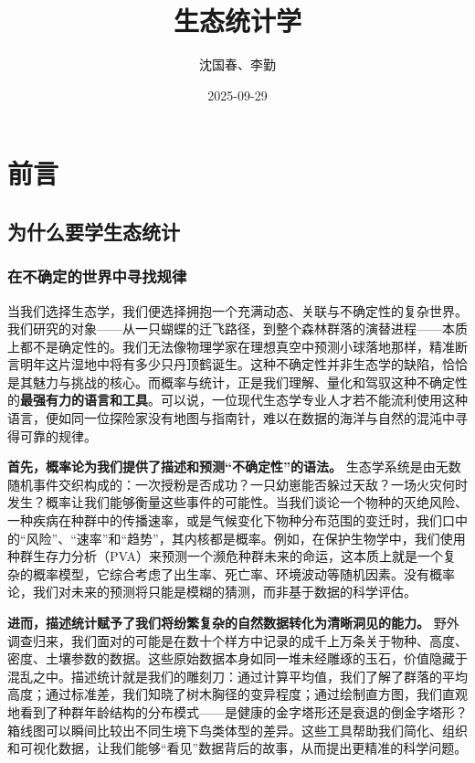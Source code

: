 \documentclass[
]{book}
\title{生态统计学}
\author{沈国春、李勤}
\date{2025-09-29}
\begin{document}
\maketitle

{
\setcounter{tocdepth}{1}
\tableofcontents
}
\hypertarget{ux524dux8a00}{%
\chapter*{前言}\label{ux524dux8a00}}

\hypertarget{ux4e3aux4ec0ux4e48ux8981ux5b66ux751fux6001ux7edfux8ba1}{%
\section{为什么要学生态统计}\label{ux4e3aux4ec0ux4e48ux8981ux5b66ux751fux6001ux7edfux8ba1}}

\hypertarget{ux5728ux4e0dux786eux5b9aux7684ux4e16ux754cux4e2dux5bfbux627eux89c4ux5f8b}{%
\subsection{在不确定的世界中寻找规律}\label{ux5728ux4e0dux786eux5b9aux7684ux4e16ux754cux4e2dux5bfbux627eux89c4ux5f8b}}

当我们选择生态学，我们便选择拥抱一个充满动态、关联与不确定性的复杂世界。我们研究的对象------从一只蝴蝶的迁飞路径，到整个森林群落的演替进程------本质上都不是确定性的。我们无法像物理学家在理想真空中预测小球落地那样，精准断言明年这片湿地中将有多少只丹顶鹤诞生。这种不确定性并非生态学的缺陷，恰恰是其魅力与挑战的核心。而概率与统计，正是我们理解、量化和驾驭这种不确定性的\textbf{最强有力的语言和工具}。可以说，一位现代生态学专业人才若不能流利使用这种语言，便如同一位探险家没有地图与指南针，难以在数据的海洋与自然的混沌中寻得可靠的规律。

\textbf{首先，概率论为我们提供了描述和预测``不确定性''的语法。} 生态学系统是由无数随机事件交织构成的：一次授粉是否成功？一只幼崽能否躲过天敌？一场火灾何时发生？概率让我们能够衡量这些事件的可能性。当我们谈论一个物种的灭绝风险、一种疾病在种群中的传播速率，或是气候变化下物种分布范围的变迁时，我们口中的``风险''、``速率''和``趋势''，其内核都是概率。例如，在保护生物学中，我们使用种群生存力分析（PVA）来预测一个濒危种群未来的命运，这本质上就是一个复杂的概率模型，它综合考虑了出生率、死亡率、环境波动等随机因素。没有概率论，我们对未来的预测将只能是模糊的猜测，而非基于数据的科学评估。

\textbf{进而，描述统计赋予了我们将纷繁复杂的自然数据转化为清晰洞见的能力。} 野外调查归来，我们面对的可能是在数十个样方中记录的成千上万条关于物种、高度、密度、土壤参数的数据。这些原始数据本身如同一堆未经雕琢的玉石，价值隐藏于混乱之中。描述统计就是我们的雕刻刀：通过计算平均值，我们了解了群落的平均高度；通过标准差，我们知晓了树木胸径的变异程度；通过绘制直方图，我们直观地看到了种群年龄结构的分布模式------是健康的金字塔形还是衰退的倒金字塔形？箱线图可以瞬间比较出不同生境下鸟类体型的差异。这些工具帮助我们简化、组织和可视化数据，让我们能够``看见''数据背后的故事，从而提出更精准的科学问题。
\end{document}

